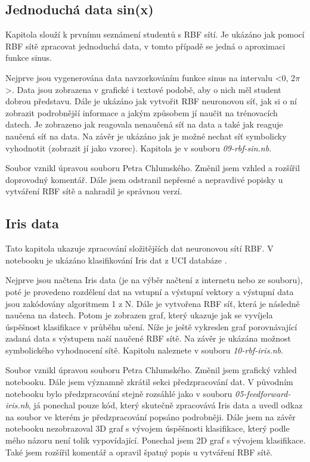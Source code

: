 \documentclass[11pt,twoside,a4paper]{book}
\begin{document}
\subsection{Jednoduchá data sin(x)}
Kapitola slouží k prvnímu seznámení studentů s RBF sítí. Je ukázáno jak pomocí RBF sítě zpracovat jednoduchá data, v tomto případě se jedná o aproximaci funkce sinus.

Nejprve jsou vygenerována data navzorkováním funkce sinus na intervalu <0, 2\begin{math}\pi \end{math}>. Data jsou zobrazena v grafické i textové podobě, aby o nich měl student dobrou představu. Dále je ukázáno jak vytvořit RBF neuronovou síť, jak si o ní zobrazit podrobnější informace a jakým způsobem jí naučit na trénovacích datech. Je zobrazeno jak reagovala nenaučená síť na data a také jak reaguje naučená síť na data. Na závěr je ukázáno jak je možné nechat síť symbolicky vyhodnotit (zobrazit jí jako vzorec). Kapitola je v souboru \textit{09-rbf-sin.nb}.

Soubor vznikl úpravou souboru Petra Chlumského. Změnil jsem vzhled a rozšířil doprovodný komentář. Dále jsem odstranil nepřesné a nepravdivé popisky u vytváření RBF sítě a nahradil je správnou verzí.
\subsection{Iris data}
Tato kapitola ukazuje zpracování složitějších dat neuronovou sítí RBF. V notebooku je ukázáno klasifikování Iris dat z UCI databáze \cite{UCI}.

Nejprve jsou načtena Iris data (je na výběr načtení z internetu nebo ze souboru), poté je provedeno rozdělení dat na vstupní a výstupní vektory a výstupní data jsou zakódovány algoritmem 1 z N. Dále je vytvořena RBF síť, která je následně naučena na datech. Potom je zobrazen graf, který ukazuje jak se vyvíjela úspěšnost klasifikace v průběhu učení. Níže je ještě vykreslen graf porovnávající zadaná data s výstupem naší naučené RBF sítě. Na závěr je ukázána možnost symbolického vyhodnocení sítě. Kapitolu naleznete v souboru \textit{10-rbf-iris.nb}.

Soubor vznikl úpravou souboru Petra Chlumského. Změnil jsem grafický vzhled notebooku. Dále jsem významně zkrátil sekci předzpracování dat. V původním notebooku bylo předzpracování stejně rozsáhlé jako v souboru \textit{05-feedforward-iris.nb}, já ponechal pouze kód, který skutečně zpracovává Iris data a uvedl odkaz na soubor ve kterém je předzpracování popsáno podrobněji. Dále jsem na závěr notebooku nezobrazoval 3D graf s vývojem úspěšnosti klasifikace, který podle mého názoru není tolik vypovídající. Ponechal jsem 2D graf s vývojem klasifikace. Také jsem rozšířil komentář a opravil špatný popis u vytváření RBF sítě.
\end{document}
